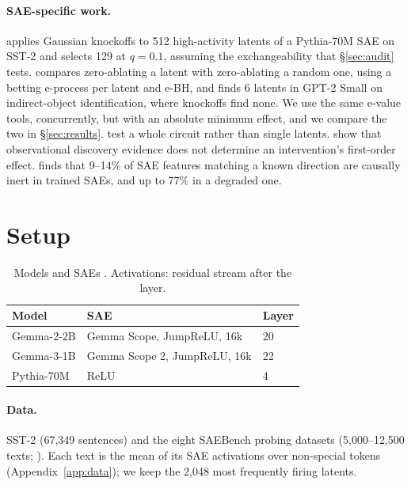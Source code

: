 \paragraph{SAE-specific work.} \citet{enkhbayar2025} applies Gaussian knockoffs to 512 high-activity latents of a Pythia-70M
SAE on SST-2 and selects 129 at $q = 0.1$, assuming the exchangeability that \S\ref{sec:audit} tests. \citet{khera2026}
compares zero-ablating a latent with zero-ablating a random one, using a betting e-process per latent and e-BH, and finds 6 latents
in GPT-2 Small on indirect-object identification, where knockoffs find none. We use the same e-value tools, concurrently,
but with an absolute minimum effect, and we compare the two in \S\ref{sec:results}. \citet{shi2024hypothesis} test a whole
circuit rather than single latents. \citet{guo2026discovery} show that observational discovery evidence does not determine an
intervention's first-order effect. \citet{bal2026} finds that 9--14\% of SAE features matching a known direction are
causally inert in trained SAEs, and up to 77\% in a degraded one.

\section{Setup}
\label{sec:setup}

\begin{table}[t]
\centering
\small
\setlength{\tabcolsep}{3pt}
\begin{tabular}{lll}
\toprule
Model & SAE & Layer \\
\midrule
Gemma-2-2B & Gemma Scope, JumpReLU, 16k & 20 \\
Gemma-3-1B & Gemma Scope 2, JumpReLU, 16k & 22 \\
Pythia-70M & ReLU \citep{marks2025sparse} & 4 \\
\bottomrule
\end{tabular}
\caption{Models \citep{team2024gemma, team2025gemma3, biderman2023pythia} and SAEs
\citep{lieberum2024gemma, mcdougall2025gemmascope2}. Activations: residual stream after the layer.}
\label{tab:models}
\end{table}

\paragraph{Data.} SST-2 \citep{socher2013recursive} (67,349 sentences) and the eight SAEBench probing
datasets (5,000--12,500 texts; \citealp{karvonen2025saebench}). Each text is the mean of its SAE
activations over non-special tokens (Appendix~\ref{app:data}); we keep the 2,048 most frequently firing latents.

